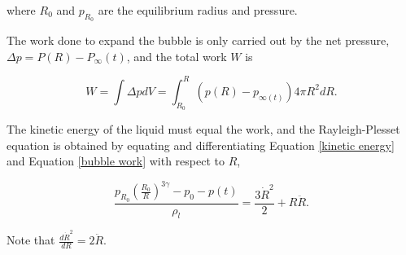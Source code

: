 where $R_0$ and $p_{R_0}$ are the equilibrium radius and pressure. 

The work done to expand the bubble is only carried out by the net pressure, $\Delta p = P(R)-P_{\infty}(t)$, and the total work $W$ is

\begin{equation}
\label{bubble work}
W = \int \Delta p dV = \int_{R_0}^R (p(R)-p_{\infty(t)})4\pi R^2 dR.
\end{equation}

The kinetic energy of the liquid must equal the work, and the Rayleigh-Plesset equation is obtained by equating and differentiating Equation \eqref{kinetic energy} and Equation \eqref{bubble work} with respect to $R$, 

\begin{equation}
\label{RPE}
\frac{p_{R_0}\left(\frac{R_0}{R}\right)^{3\gamma}-p_0 - p(t)}{\rho_l} = \frac{3\dot{R}^2}{2}+R\ddot{R}.
\end{equation}

Note that $\frac{d\dot{R}^2}{dR} = 2\ddot{R}$. 

